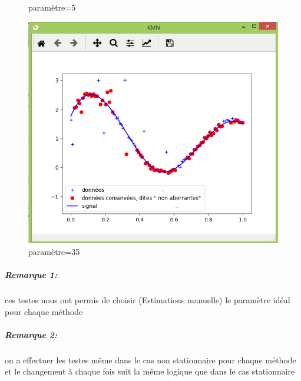 \documentclass[11pt]{report}
\begin{document}
\begin{figure}[!htb]
\caption{paramètre=5}
\label{m5}
\endminipage
{}%
\includegraphics[width=\linewidth]{kmn35.PNG}  
\caption{paramètre=35}
\label{m35}
\endminipage

\end{figure}

\subparagraph{Remarque 1:} ces testes nous ont permis de choisir (Estimations manuelle) le paramètre idéal pour  chaque méthode 
\subparagraph{Remarque 2:} on a effectuer les testes même dans le cas non stationnaire pour chaque méthode et le changement à chaque fois suit la même logique que dans le cas stationnaire \vspace{3cm}
\end{document}
